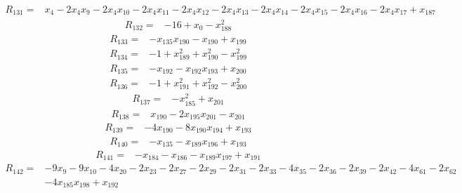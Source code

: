 \begin{align*}
R_{131}={}&x_{4}-2x_{4}x_{9}-2x_{4}x_{10}-2x_{4}x_{11}-2x_{4}x_{12}-2x_{4}x_{13}-2x_{4}x_{14}-2x_{4}x_{15}-2x_{4}x_{16}-2x_{4}x_{17}+x_{187}
\end{align*}
\begin{align*}
R_{132}={}&-16+x_{0}-x_{188}^{2}
\end{align*}
\begin{align*}
R_{133}={}&-x_{135}x_{190}-x_{190}+x_{199}
\end{align*}
\begin{align*}
R_{134}={}&-1+x_{189}^{2}+x_{190}^{2}-x_{199}^{2}
\end{align*}
\begin{align*}
R_{135}={}&-x_{192}-x_{192}x_{193}+x_{200}
\end{align*}
\begin{align*}
R_{136}={}&-1+x_{191}^{2}+x_{192}^{2}-x_{200}^{2}
\end{align*}
\begin{align*}
R_{137}={}&-x_{185}^{2}+x_{201}
\end{align*}
\begin{align*}
R_{138}={}&x_{190}-2x_{195}x_{201}-x_{201}
\end{align*}
\begin{align*}
R_{139}={}&-4x_{190}-8x_{190}x_{194}+x_{193}
\end{align*}
\begin{align*}
R_{140}={}&-x_{135}-x_{189}x_{196}+x_{193}
\end{align*}
\begin{align*}
R_{141}={}&-x_{184}-x_{186}-x_{189}x_{197}+x_{191}
\end{align*}
\begin{align*}
R_{142}={}&-9x_{9}-9x_{10}-4x_{20}-2x_{23}-2x_{27}-2x_{29}-2x_{31}-2x_{33}-4x_{35}-2x_{36}-2x_{39}-2x_{42}-4x_{61}-2x_{62}\\
{}&-4x_{185}x_{198}+x_{192}
\end{align*}
